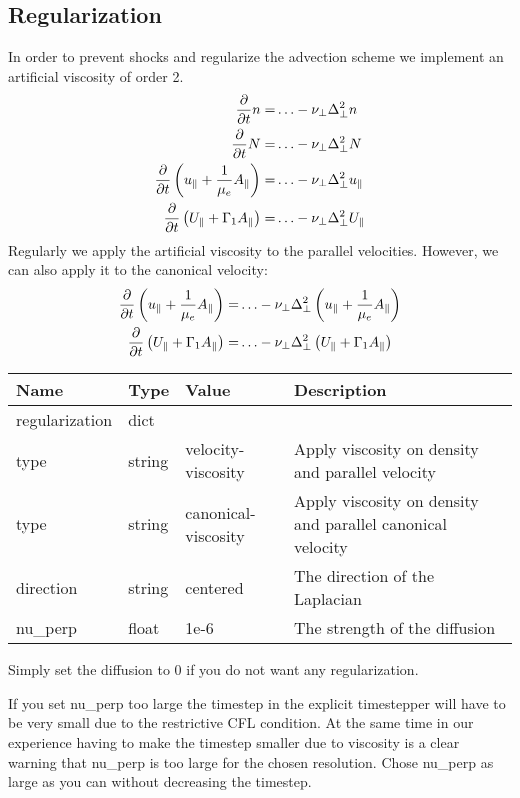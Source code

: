 \subsection{Regularization} \label{sec:regularization}
In order to prevent shocks and regularize the advection scheme
we implement an artificial viscosity of order 2.
\begin{align}
    \frac{\partial}{\partial t} n  =& \ldots -\nu_\perp \Delta_\perp^2 n 
\\
\frac{\partial}{\partial t} N =& \ldots -\nu_\perp \Delta_\perp^2 N
 \\
\frac{\partial}{\partial t} \left( u_\parallel+ \frac{1}{\mu_e} A_\parallel \right) =&
\ldots -\nu_\perp \Delta_\perp^2 u_\parallel
      \\
      \frac{\partial}{\partial t} \left( U_\parallel+ \Gamma_1 A_\parallel  \right) =& \ldots -\nu_\perp \Delta_\perp^2 U_\parallel
\end{align}
Regularly we apply the artificial viscosity to the parallel velocities. However,
we can also apply it to the canonical velocity:
\begin{align}
\frac{\partial}{\partial t} \left( u_\parallel+ \frac{1}{\mu_e} A_\parallel \right) =&
\ldots -\nu_\perp \Delta_\perp^2 \left( u_\parallel+ \frac{1}{\mu_e} A_\parallel \right)
      \\
      \frac{\partial}{\partial t} \left( U_\parallel+ \Gamma_1 A_\parallel  \right) =& \ldots -\nu_\perp \Delta_\perp^2 \left( U_\parallel+ \Gamma_1 A_\parallel  \right)
\end{align}
\begin{longtable}{llll}
\toprule
\rowcolor{gray!50}\textbf{Name} &  \textbf{Type} & \textbf{Value}  & \textbf{Description}  \\ \midrule
regularization & dict & & \\
\qquad type & string & velocity-viscosity & Apply viscosity on density and parallel velocity \\
\qquad type & string & canonical-viscosity & Apply viscosity on density and parallel canonical velocity \\
\qquad direction & string & centered & The direction of the Laplacian \\
\qquad nu\_perp & float & 1e-6  &  The strength of the diffusion \\
\bottomrule
\end{longtable}
Simply set the diffusion to 0 if you do not want any regularization.
\begin{tcolorbox}[title=Note]
    If you set nu\_perp too large the timestep in the explicit timestepper will
    have to be very small due to the restrictive CFL condition. At the same
    time in our experience having to make the timestep smaller due to viscosity
    is a clear warning that nu\_perp is too large for the chosen resolution.
    Chose nu\_perp as large as you can without decreasing the timestep.
\end{tcolorbox}

